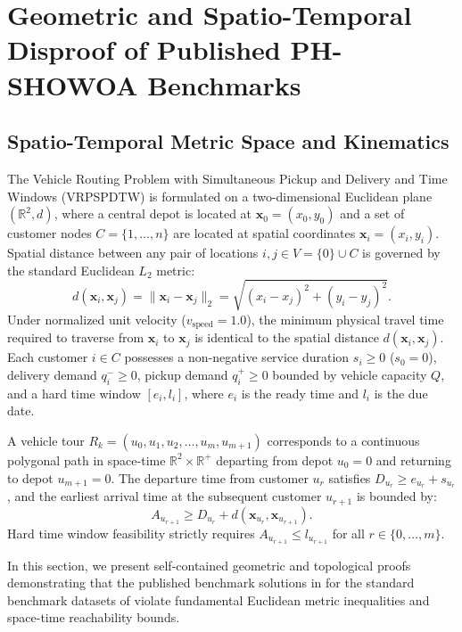 \section{Geometric and Spatio-Temporal Disproof of Published PH-SHOWOA Benchmarks}
\label{sec:geometric_disproof}

\subsection{Spatio-Temporal Metric Space and Kinematics}
\label{sec:metric_space}
The Vehicle Routing Problem with Simultaneous Pickup and Delivery and Time Windows (VRPSPDTW) is formulated on a two-dimensional Euclidean plane $(\mathbb{R}^2, d)$, where a central depot is located at $\mathbf{x}_0 = (x_0, y_0)$ and a set of customer nodes $C = \{1, \dots, n\}$ are located at spatial coordinates $\mathbf{x}_i = (x_i, y_i)$. Spatial distance between any pair of locations $i, j \in V = \{0\} \cup C$ is governed by the standard Euclidean $L_2$ metric:
\begin{equation}
d(\mathbf{x}_i, \mathbf{x}_j) = \|\mathbf{x}_i - \mathbf{x}_j\|_2 = \sqrt{(x_i - x_j)^2 + (y_i - y_j)^2}.
\end{equation}
Under normalized unit velocity ($v_{\text{speed}} = 1.0$), the minimum physical travel time required to traverse from $\mathbf{x}_i$ to $\mathbf{x}_j$ is identical to the spatial distance $d(\mathbf{x}_i, \mathbf{x}_j)$. Each customer $i \in C$ possesses a non-negative service duration $s_i \ge 0$ ($s_0 = 0$), delivery demand $q_i^- \ge 0$, pickup demand $q_i^+ \ge 0$ bounded by vehicle capacity $Q$, and a hard time window $[e_i, l_i]$, where $e_i$ is the ready time and $l_i$ is the due date.

A vehicle tour $R_k = (u_0, u_1, u_2, \dots, u_m, u_{m+1})$ corresponds to a continuous polygonal path in space-time $\mathbb{R}^2 \times \mathbb{R}^+$ departing from depot $u_0 = 0$ and returning to depot $u_{m+1} = 0$. The departure time from customer $u_r$ satisfies $D_{u_r} \ge e_{u_r} + s_{u_r}$, and the earliest arrival time at the subsequent customer $u_{r+1}$ is bounded by:
\begin{equation}
A_{u_{r+1}} \ge D_{u_r} + d(\mathbf{x}_{u_r}, \mathbf{x}_{u_{r+1}}).
\end{equation}
Hard time window feasibility strictly requires $A_{u_{r+1}} \le l_{u_{r+1}}$ for all $r \in \{0, \dots, m\}$.

In this section, we present self-contained geometric and topological proofs demonstrating that the published benchmark solutions in \cite{nguyen2026phshowoa} for the standard benchmark datasets of \cite{wang2012coevolutionary} violate fundamental Euclidean metric inequalities and space-time reachability bounds.

